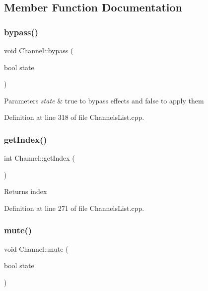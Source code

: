 \subsection{Member Function Documentation}
\mbox{\label{class_channel_a2574d67b3f0d3f90c04a6154b96e303a}} 
\subsubsection{\texorpdfstring{bypass()}{bypass()}}
{\footnotesize\ttfamily void Channel\+::bypass (\begin{DoxyParamCaption}\item[{bool}]{state }\end{DoxyParamCaption})}


\begin{DoxyParams}{Parameters}
{\em state} & true to bypass effects and false to apply them \\
\hline
\end{DoxyParams}


Definition at line 318 of file Channels\+List.\+cpp.

\mbox{\label{class_channel_af0427a10e1713ba8327df0b0cd0fb2f5}} 
\subsubsection{\texorpdfstring{get\+Index()}{getIndex()}}
{\footnotesize\ttfamily int Channel\+::get\+Index (\begin{DoxyParamCaption}{ }\end{DoxyParamCaption})}

\begin{DoxyReturn}{Returns}
index 
\end{DoxyReturn}


Definition at line 271 of file Channels\+List.\+cpp.

\mbox{\label{class_channel_a88f542e0f6d1e1d384ad8bf79a9e305b}} 
\subsubsection{\texorpdfstring{mute()}{mute()}}
{\footnotesize\ttfamily void Channel\+::mute (\begin{DoxyParamCaption}\item[{bool}]{state }\end{DoxyParamCaption})}


